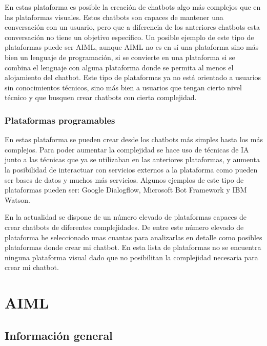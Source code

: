 En estas plataforma es posible la creación de chatbots algo más complejos que en las plataformas visuales. Estos chatbots son capaces de mantener una conversación con un usuario, pero que a diferencia de los anteriores chatbots esta conversación no tiene un objetivo específico. Un posible ejemplo de este tipo de plataformas puede ser AIML, aunque AIML no es en sí una plataforma sino más bien un lenguaje de programación, si se convierte en una plataforma si se combina el lenguaje con alguna plataforma donde se permita al menos el alojamiento del chatbot. Este tipo de plataformas ya no está orientado a usuarios sin conocimientos técnicos, sino más bien a usuarios que tengan cierto nivel técnico y que busquen crear chatbots con cierta complejidad. 

\subsubsection*{Plataformas programables}

En estas plataforma se pueden crear desde los chatbots más simples hasta los más complejos. Para poder aumentar la complejidad se hace uso de técnicas de IA junto a las técnicas que ya se utilizaban en las anteriores plataformas, y aumenta la posibilidad de interactuar con servicios externos a la plataforma como pueden ser bases de datos y muchos más servicios. Algunos ejemplos de este tipo de plataformas pueden ser: Google Dialogflow, Microsoft Bot Framework y IBM Watson. \newline\newline


En la actualidad se dispone de un número elevado de plataformas capaces de crear chatbots de diferentes complejidades. De entre este número elevado de plataforma he seleccionado unas cuantas para analizarlas en detalle como posibles plataformas donde crear mi chatbot. En esta lista de plataformas no se encuentra ninguna plataforma visual dado que no posibilitan la complejidad necesaria para crear mi chatbot.


\section{AIML}

\subsection*{Información general}

